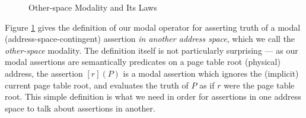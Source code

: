 \begin{figure}
\footnotesize
{}
  \caption{Other-space Modality and Its Laws}
  \label{fig:modaldef}
  \end{figure}
Figure \ref{fig:modaldef} gives the definition of our modal operator for asserting truth of a modal
(address-space-contingent) assertion \emph{in another address space}, which we call
the \emph{other-space} modality. The definition itself is not
particularly surprising --- as our modal assertions are semantically predicates on a page table root (physical)
address, the assertion $[r](P)$ is a modal assertion which ignores the (implicit) current page table root,
and evaluates the truth of $P$ as if $r$ were the page table root. This simple definition is 
what we need in order for assertions in one address space to talk about assertions in another.

